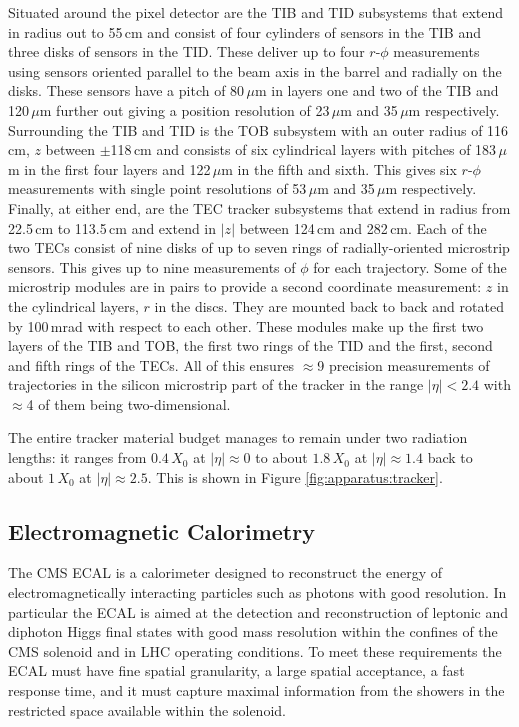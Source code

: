 Situated around the pixel detector are the TIB and TID subsystems that extend in radius out to 55\,cm and consist of four cylinders of sensors in the TIB and three disks of sensors in the TID. These deliver up to four $r$-$\phi$ measurements using sensors oriented parallel to the beam axis in the barrel and radially on the disks. These sensors have a pitch of 80\,$\mu$m in layers one and two of the TIB and 120\,$\mu$m further out giving a position resolution of 23\,$\mu$m and 35\,$\mu$m respectively. 
Surrounding the TIB and TID is the TOB subsystem with an outer radius of 116\,cm, $z$ between $\pm$118\,cm and consists of six cylindrical layers with pitches of 183\,$\mu$m in the first four layers and 122\,$\mu$m in the fifth and sixth. This gives six $r$-$\phi$ measurements with single point resolutions of 53\,$\mu$m and 35\,$\mu$m respectively. 
Finally, at either end, are the TEC tracker subsystems that extend in radius from 22.5\,cm to 113.5\,cm and extend in $|z|$ between 124\,cm and 282\,cm. Each of the two TECs consist of nine disks of up to seven rings of radially-oriented microstrip sensors. This gives up to nine measurements of $\phi$ for each trajectory.  
Some of the microstrip modules are in pairs to provide a second coordinate measurement: $z$ in the cylindrical layers, $r$ in the discs. They are mounted back to back and rotated by 100\,mrad with respect to each other. These modules make up the first two layers of the TIB and TOB, the first two rings of the TID and the first, second and fifth rings of the TECs.  
All of this ensures $\approx$9 precision measurements of trajectories in the silicon microstrip part of the tracker in the range $|\eta|<2.4$ with $\approx$4 of them being two-dimensional.


The entire tracker material budget manages to remain under two radiation lengths: it ranges from $0.4$\,$X_{0}$ at $|\eta|\approx{0}$ to about $1.8$\,$X_{0}$ at $|\eta|\approx{1.4}$ back to about $1$\,$X_{0}$ at $|\eta|\approx{2.5}$. This is shown in Figure \ref{fig:apparatus:tracker}.


\subsection{Electromagnetic Calorimetry}

The CMS ECAL \cite{CMSEcalTDR} is a calorimeter designed to reconstruct the energy of electromagnetically interacting particles such as photons with good resolution. In particular the ECAL is aimed at the detection and reconstruction of leptonic and diphoton Higgs final states with good mass resolution within the confines of the CMS solenoid and in LHC operating conditions. To meet these requirements the ECAL must have fine spatial granularity, a large spatial acceptance, a fast response time, and it must capture maximal information from the showers in the restricted space available within the solenoid. 

